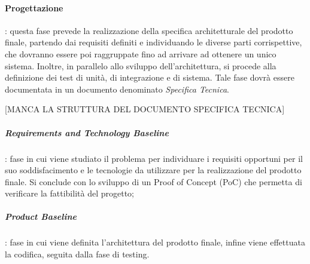 \paragraph{Progettazione}: questa fase prevede la realizzazione della specifica architetturale del prodotto finale, partendo dai requisiti definiti e individuando le diverse parti corrispettive, che dovranno essere poi raggruppate fino ad arrivare ad ottenere un unico sistema. \newline
Inoltre, in parallelo allo sviluppo dell'architettura, si procede alla definizione dei test di unità, di integrazione e di sistema. \newline
Tale fase dovrà essere documentata in un documento denominato \textit{Specifica Tecnica}.

[MANCA LA STRUTTURA DEL DOCUMENTO SPECIFICA TECNICA]

\subparagraph{Requirements and Technology Baseline}: fase in cui viene studiato il problema per individuare i requisiti opportuni per il suo soddisfacimento e le tecnologie da utilizzare per la realizzazione del prodotto finale. \newline
Si conclude con lo sviluppo di un Proof of Concept (PoC) che permetta di verificare la fattibilità del progetto;

\subparagraph{Product Baseline}: fase in cui viene definita l'architettura del prodotto finale, infine viene effettuata la codifica, seguita dalla fase di testing.


